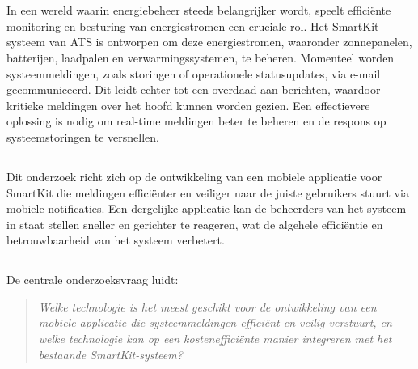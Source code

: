 
\chapter{}%
\label{ch:inleiding}

\noindent In een wereld waarin energiebeheer steeds belangrijker wordt, speelt efficiënte monitoring en besturing van energiestromen een cruciale rol. Het SmartKit-systeem van ATS is ontworpen om deze energiestromen, waaronder zonnepanelen, batterijen, laadpalen en verwarmingssystemen, te beheren. Momenteel worden systeemmeldingen, zoals storingen of operationele statusupdates, via e-mail gecommuniceerd. Dit leidt echter tot een overdaad aan berichten, waardoor kritieke meldingen over het hoofd kunnen worden gezien. Een effectievere oplossing is nodig om real-time meldingen beter te beheren en de respons op systeemstoringen te versnellen. \\

\section{}%
\label{sec:probleemstelling}

\noindent Dit onderzoek richt zich op de ontwikkeling van een mobiele applicatie voor SmartKit die meldingen efficiënter en veiliger naar de juiste gebruikers stuurt via mobiele notificaties. Een dergelijke applicatie kan de beheerders van het systeem in staat stellen sneller en gerichter te reageren, wat de algehele efficiëntie en betrouwbaarheid van het systeem verbetert. \\

\section{}%
\label{sec:onderzoeksvraag}

\noindent De centrale onderzoeksvraag luidt:

\begin{quote}
    \textit{Welke technologie is het meest geschikt voor de ontwikkeling van een mobiele applicatie die systeemmeldingen efficiënt en veilig verstuurt, en welke technologie kan op een kostenefficiënte manier integreren met het bestaande SmartKit-systeem?}
\end{quote}

